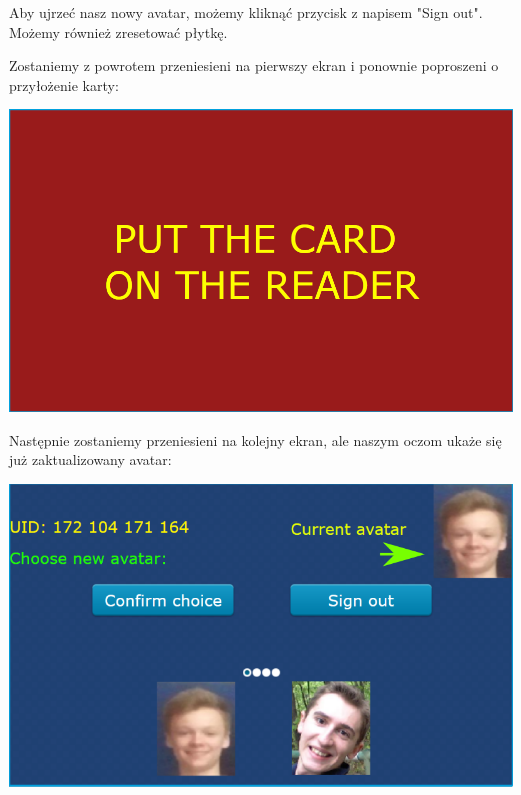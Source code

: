 \documentclass[12pt,hidelinks]{article}
\begin{document}
    Aby ujrzeć nasz nowy avatar, możemy kliknąć przycisk z napisem "Sign out". Możemy również zresetować płytkę.

    Zostaniemy z powrotem przeniesieni na pierwszy ekran i ponownie poproszeni o przyłożenie karty:

    \begin{center}
        \includegraphics[scale=0.75]{img/screen1.png}
    \end{center}

    Następnie zostaniemy przeniesieni na kolejny ekran, ale naszym oczom ukaże się już zaktualizowany avatar:

    \begin{center}
        \includegraphics[scale=0.75]{img/screen2-again.png}
    \end{center}
    \vspace{-1.5mm}

    \newpage

\end{document}
